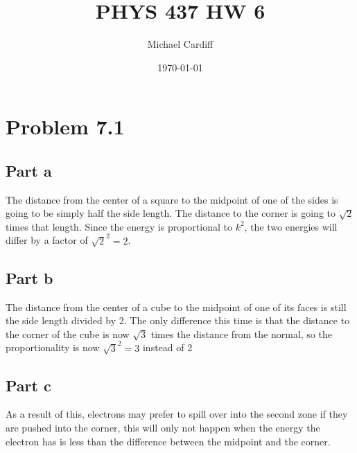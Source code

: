 \documentclass[12pt]{article}
\title{PHYS 437 HW 6}
\author{Michael Cardiff}
\date{\today}
\begin{document}
\maketitle

\section{Problem 7.1}
\subsection{Part a}
The distance from the center of a square to the midpoint of one of the sides is going to be simply half the side length. The distance to the corner is going to $\sqrt{2}$ times that length. Since the energy is proportional to $k^2$, the two energies will differ by a factor of $\sqrt{2}^2=2$.
\subsection{Part b}
The distance from the center of a cube to the midpoint of one of its faces is still the side length divided by 2. The only difference this time is that the distance to the corner of the cube is now $\sqrt{3}$ times the distance from the normal, so the proportionality is now $\sqrt{3}^2=3$ instead of 2
\subsection{Part c}
As a result of this, electrons may prefer to spill over into the second zone if they are pushed into the corner, this will only not happen when the energy the electron has is less than the difference between the midpoint and the corner.
\end{document}
